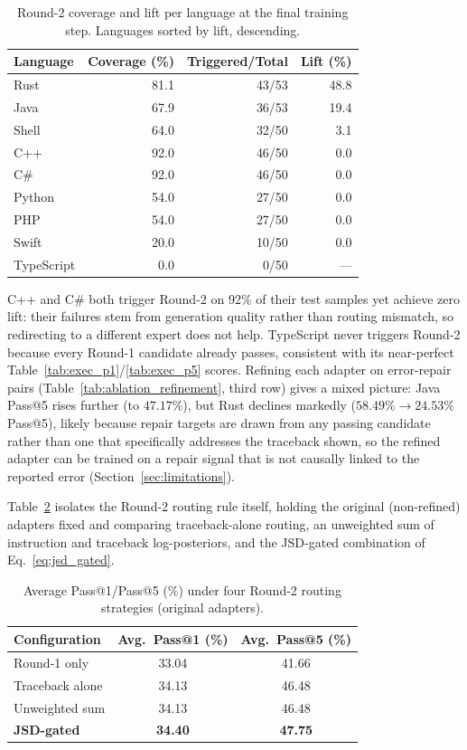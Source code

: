 \begin{table}[t]
\centering
\caption{Round-2 coverage and lift per language at the final training step. Languages sorted by lift, descending.}
\label{tab:r2_lang}
\small
\begin{tabular}{lrrr}
\toprule
Language   & Coverage (\%) & Triggered/Total & Lift (\%) \\
\midrule
Rust       & 81.1 & 43/53 & 48.8 \\
Java       & 67.9 & 36/53 & 19.4 \\
Shell      & 64.0 & 32/50 &  3.1 \\
C++        & 92.0 & 46/50 &  0.0 \\
C\#        & 92.0 & 46/50 &  0.0 \\
Python     & 54.0 & 27/50 &  0.0 \\
PHP        & 54.0 & 27/50 &  0.0 \\
Swift      & 20.0 & 10/50 &  0.0 \\
TypeScript &  0.0 &  0/50 & --- \\
\bottomrule
\end{tabular}
\end{table}

C++ and C\# both trigger Round-2 on 92\% of their test samples yet achieve zero lift: their failures stem from generation quality rather than routing mismatch, so redirecting to a different expert does not help. TypeScript never triggers Round-2 because every Round-1 candidate already passes, consistent with its near-perfect Table~\ref{tab:exec_p1}/\ref{tab:exec_p5} scores. Refining each adapter on error-repair pairs (Table~\ref{tab:ablation_refinement}, third row) gives a mixed picture: Java Pass@5 rises further (to $47.17\%$), but Rust declines markedly ($58.49\%\to24.53\%$ Pass@5), likely because repair targets are drawn from any passing candidate rather than one that specifically addresses the traceback shown, so the refined adapter can be trained on a repair signal that is not causally linked to the reported error (Section~\ref{sec:limitations}).

Table~\ref{tab:jsd_summary} isolates the Round-2 routing rule itself, holding the original (non-refined) adapters fixed and comparing traceback-alone routing, an unweighted sum of instruction and traceback log-posteriors, and the JSD-gated combination of Eq.~\eqref{eq:jsd_gated}.

\begin{table}[t]
\centering
\caption{Average Pass@1/Pass@5 (\%) under four Round-2 routing strategies (original adapters).}
\label{tab:jsd_summary}
\small
\begin{tabular}{lcc}
\toprule
Configuration & Avg.\ Pass@1 (\%) & Avg.\ Pass@5 (\%) \\
\midrule
Round-1 only               & 33.04 & 41.66 \\
Traceback alone            & 34.13 & 46.48 \\
Unweighted sum              & 34.13 & 46.48 \\
\textbf{JSD-gated}          & \textbf{34.40} & \textbf{47.75} \\
\bottomrule
\end{tabular}
\end{table}

